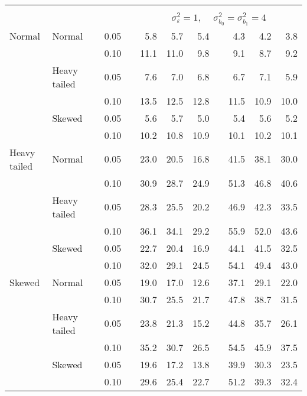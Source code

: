 \begin{table}[ht]
\begin{scriptsize}
\begin{center}
\begin{tabular}{ll p{.1cm} c p{.1cm} rrr p{.1cm} rrr}
&&&&&&&&&&&\\
& && && \multicolumn{7}{c}{$\sigma_{\varepsilon}^2 = 1$, \ \ $\sigma_{b_0}^2 = \sigma_{b_1}^2 = 4$} \\ \cline{6-12}
Normal       & Normal       && 0.05 &&   5.8 & 5.7 & 5.4 &   & 4.3 & 4.2 & 3.8 \\ 
             &              && 0.10 &&   11.1 & 11.0 & 9.8 &   & 9.1 & 8.7 & 9.2 \\ 
             & Heavy tailed && 0.05 &&   7.6 & 7.0 & 6.8 &   & 6.7 & 7.1 & 5.9 \\ 
             &              && 0.10 &&   13.5 & 12.5 & 12.8 &   & 11.5 & 10.9 & 10.0 \\ 
             & Skewed       && 0.05 &&   5.6 & 5.7 & 5.0 &   & 5.4 & 5.6 & 5.2 \\ 
             &              && 0.10 &&   10.2 & 10.8 & 10.9 &   & 10.1 & 10.2 & 10.1 \\ 
Heavy tailed & Normal       && 0.05 &&   23.0 & 20.5 & 16.8 &   & 41.5 & 38.1 & 30.0 \\ 
             &              && 0.10 &&   30.9 & 28.7 & 24.9 &   & 51.3 & 46.8 & 40.6 \\ 
             & Heavy tailed && 0.05 &&   28.3 & 25.5 & 20.2 &   & 46.9 & 42.3 & 33.5 \\ 
             &              && 0.10 &&   36.1 & 34.1 & 29.2 &   & 55.9 & 52.0 & 43.6 \\ 
             & Skewed       && 0.05 &&   22.7 & 20.4 & 16.9 &   & 44.1 & 41.5 & 32.5 \\ 
             &              && 0.10 &&   32.0 & 29.1 & 24.5 &   & 54.1 & 49.4 & 43.0 \\ 
Skewed       & Normal       && 0.05 &&   19.0 & 17.0 & 12.6 &   & 37.1 & 29.1 & 22.0 \\ 
             &              && 0.10 &&   30.7 & 25.5 & 21.7 &   & 47.8 & 38.7 & 31.5 \\ 
             & Heavy tailed && 0.05 &&   23.8 & 21.3 & 15.2 &   & 44.8 & 35.7 & 26.1 \\ 
             &              && 0.10 &&   35.2 & 30.7 & 26.5 &   & 54.5 & 45.9 & 37.5 \\ 
             & Skewed       && 0.05 &&   19.6 & 17.2 & 13.8 &   & 39.9 & 30.3 & 23.5 \\ 
             &              && 0.10 &&   29.6 & 25.4 & 22.7 &   & 51.2 & 39.3 & 32.4 \\ 

\hline
\end{tabular}
\end{center}
\end{scriptsize}
\end{table}

